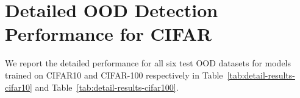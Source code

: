 \documentclass[runningheads]{llncs}
\newcommand{\methodAbbr}{DICE~}
\begin{document}
\begin{table*}[ht]
\caption[]{\small Effect of applying \methodAbbr with MSP on DenseNet101 pretrained on CIFAR-10. The number is reported in FPR95. }
\centering
{}
\label{tab:dice_msp}
\end{table*}





\section{Detailed OOD Detection Performance for CIFAR}
\label{sec:detailed-cifar}
We report the detailed performance for all six test OOD datasets for models trained on CIFAR10 and CIFAR-100 respectively in Table~\ref{tab:detail-results-cifar10}
 and Table~\ref{tab:detail-results-cifar100}.
 
\end{document}
